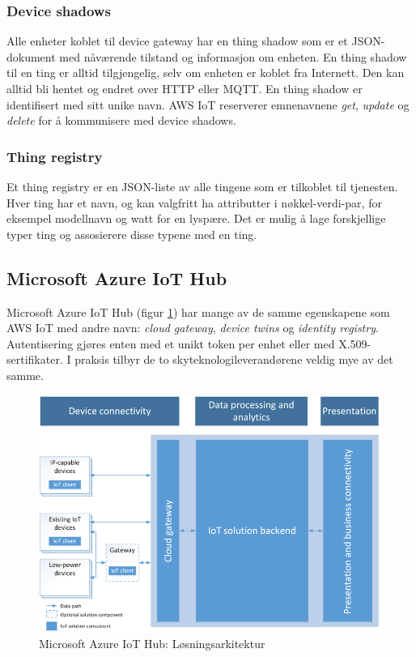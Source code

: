 \subsubsection{Device shadows}
\label{sec:deviceshadows}
Alle enheter koblet til device gateway har en thing shadow som er et JSON-dokument
med nåværende tilstand og informasjon om enheten. En thing shadow til en ting er alltid tilgjengelig,
selv om enheten er koblet fra Internett. Den kan alltid bli hentet og endret over HTTP eller MQTT. En thing shadow
er identifisert med sitt unike navn. AWS IoT reserverer emnenavnene \textit{get}, \textit{update}
og \textit{delete} for å kommunisere med device shadows.

\subsubsection{Thing registry}
Et thing registry er en JSON-liste av alle tingene som er tilkoblet til tjenesten. Hver ting
har et navn, og kan valgfritt ha attributter i nøkkel-verdi-par, for eksempel modellnavn og watt
for en lyspære. Det er mulig å lage forskjellige typer ting og assosierere disse typene med en ting.

\subsection{Microsoft Azure IoT Hub}
\label{sec:azureiot}
Microsoft Azure IoT Hub (figur \ref{fig:azure_iot}) har mange av de samme egenskapene som AWS IoT med andre navn: \textit{cloud gateway},
\textit{device twins} og \textit{identity registry}. Autentisering gjøres enten med et unikt token per enhet eller med
X.509-sertifikater. I praksis tilbyr de to skyteknologileverandørene veldig mye av det samme.

\begin{figure}
\includegraphics[width=1.0\textwidth,center]{fig/iot-reference-architecture}
\caption{Microsoft Azure IoT Hub: Løsningsarkitektur \citep{azure_architecture}}
\label{fig:azure_iot}
\end{figure}

